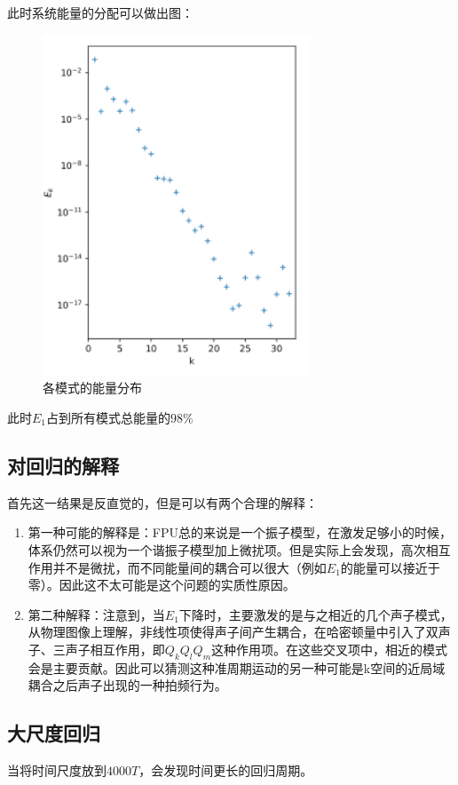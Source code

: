 \documentclass[a4paper]{ctexart}
\begin{document}
此时系统能量的分配可以做出图：
\begin{figure}[hbt]
	\centering
	\includegraphics[width=8cm]{./fig/Prob3_4.png}
	\caption{各模式的能量分布}
\end{figure}
此时$E_1$占到所有模式总能量的$98\%$
\subsection{对回归的解释}
首先这一结果是反直觉的，但是可以有两个合理的解释：
\begin{enumerate}
	\item 第一种可能的解释是：FPU总的来说是一个振子模型，在激发足够小的时候，体系仍然可以视为一个谐振子模型加上微扰项。但是实际上会发现，高次相互作用并不是微扰，而不同能量间的耦合可以很大（例如$E_1$的能量可以接近于零）。因此这不太可能是这个问题的实质性原因。
	\item 第二种解释：注意到，当$E_1$下降时，主要激发的是与之相近的几个声子模式，从物理图像上理解，非线性项使得声子间产生耦合，在哈密顿量中引入了双声子、三声子相互作用，即$Q_{k} Q_{l} Q_{m}$这种作用项。在这些交叉项中，相近的模式会是主要贡献。因此可以猜测这种准周期运动的另一种可能是k空间的近局域耦合之后声子出现的一种拍频行为。
\end{enumerate}
\subsection{大尺度回归}
当将时间尺度放到$4000T$，会发现时间更长的回归周期。
\end{document}
